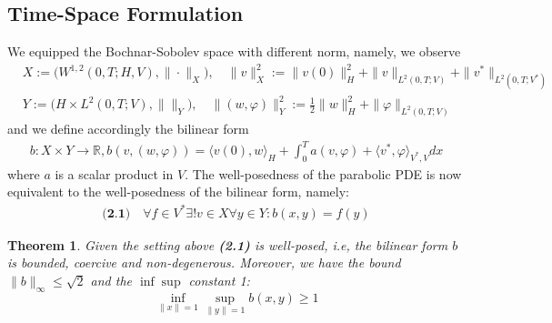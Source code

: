 \documentclass[a4paper,12pt,oneside,fleqn]{book}
\newtheorem{theorem}{Theorem}[section]
\theoremstyle{definition}
\theoremstyle{remark}
\begin{document}
\subsection{Time-Space Formulation}
We equipped the Bochnar-Sobolev space with different norm, namely, we observe
\begin{align*}
	&X:= \bigg( W^{1, 2}(0, T; H, V), \|\cdot\|_X \bigg ), \quad
	\|v\|_X^2:= \|v(0)\|_H^2 + \|v\|_{L^2(0, T; V)} + \|v^*\|_{L^2(0, T; V^*)}\\
	&Y:= \bigg( H \times L^2(0, T; V), \|\|_Y \bigg),  \quad
	\|(w, \varphi)\|_Y^2 := \frac{1}{2} \|w\|_H^2 + \|\varphi\|_{L^2(0, T; V)} 
\end{align*}
and we define accordingly the bilinear form
\begin{align*}
	b: X \times Y \rightarrow \mathbb{R}, 
	b(v, (w, \varphi)) = \langle v(0), w \rangle_H + \int_0^T a(v, \varphi) + \langle v^*, \varphi \rangle_{V^*, V} dx 
\end{align*}
where $a$ is a scalar product in $V$. 
The well-posedness of the parabolic PDE is now equivalent to the well-posedness of the bilinear form, namely:
\begin{align*} \textbf{(2.1)} \quad
	\forall f \in V^* \exists ! v \in X \forall y \in Y: b(x, y) = f(y)
\end{align*}
\begin{theorem}
	Given the setting above \textbf{(2.1)} is well-posed, i.e, the bilinear form $b$ is bounded, coercive and non-degenerous. Moreover, we have the bound $\|b\|_\infty \le \sqrt{2}$ and the $\inf \sup$ constant 1:
	\begin{equation}
		\inf_{\|x\| = 1}\sup_{\|y\| = 1} b(x, y) \ge 1
	\end{equation}
\end{theorem}
\end{document}
